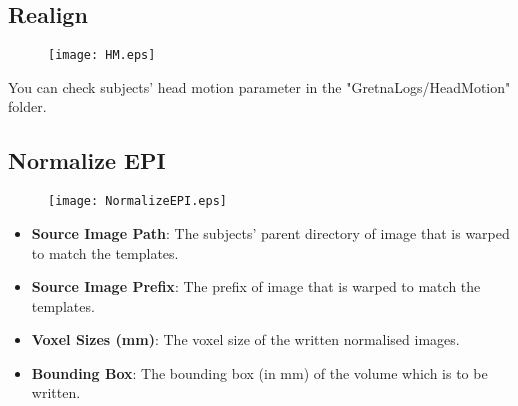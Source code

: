 \documentclass[11pt]{article}
\begin{document}
		\subsection{Realign}
			\begin{figure}
				\begin{center}
					\texttt{[image: HM.eps]}
				\end{center}
			\end{figure}
			You can check subjects' head motion parameter in the "GretnaLogs/HeadMotion" folder.
		\subsection{Normalize EPI}
			\begin{figure}
				\begin{center}
					\texttt{[image: NormalizeEPI.eps]}
				\end{center}
			\end{figure}
			\begin{itemize}
				\item \textbf{Source Image Path}: The subjects' parent directory of image that is warped to match the templates.
				\item \textbf{Source Image Prefix}: The prefix of image that is warped to match the templates.
			\end{itemize}
			\begin{itemize}
				\item \textbf{Voxel Sizes (mm)}: The voxel size of the written normalised images.
				\item \textbf{Bounding Box}: The bounding box (in mm) of the volume which is to be written. 
			\end{itemize}
\end{document}
